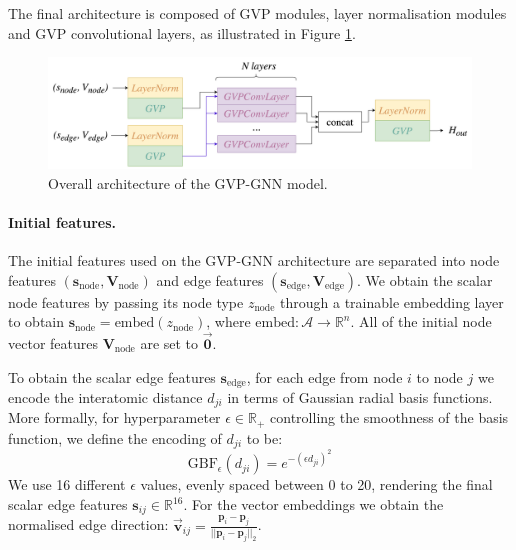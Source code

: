 The final architecture is composed of GVP modules, layer normalisation modules and GVP convolutional layers, as illustrated in Figure \ref{gvp-architecture}.
\begin{figure}
    \centering
    \includegraphics[width=\textwidth]{masters-report/figures/gvp_architecture_horizontal.png}
    \caption{Overall architecture of the GVP-GNN model.}
    \label{gvp-architecture}
\end{figure}

\paragraph{Initial features.} 
The initial features used on the GVP-GNN architecture are separated into node features $(\mathbf{s}_{\text{node}}, \mathbf{V}_{\text{node}})$ and edge features $(\mathbf{s}_{\text{edge}}, \mathbf{V}_{\text{edge}})$. We obtain the scalar node features by passing its node type $z_{\text{node}}$ through a trainable embedding layer to obtain $\mathbf{s}_{\text{node}} = \text{embed}(z_{\text{node}})$, where $\text{embed}:\mathcal{A}\rightarrow \mathbb{R}^n$. All of the initial node vector features $\mathbf{V}_{\text{node}}$ are set to $\vec{\mathbf{0}}$.

To obtain the scalar edge features $\mathbf{s}_{\text{edge}}$, for each edge from node $i$ to node $j$ we encode the interatomic distance $d_{ji}$ in terms of Gaussian radial basis functions. More formally, for hyperparameter $\epsilon\in\mathbb{R}_{+}$ controlling the smoothness of the basis function, we define the encoding of $d_{ji}$ to be:
\begin{equation}
    \text{GBF}_{\epsilon}(d_{ji}) = e^{-(\epsilon d_{ji})^2}
\end{equation}
We use 16 different $\epsilon$ values, evenly spaced between 0 to 20, rendering the final scalar edge features $\mathbf{s}_{ij} \in \mathbb{R}^{16}$. For the vector embeddings we obtain the normalised edge direction: $\vec{\mathbf{v}}_{ij} = \frac{\mathbf{p}_i - \mathbf{p}_j}{||\mathbf{p}_i - \mathbf{p}_j||_2}$. 

